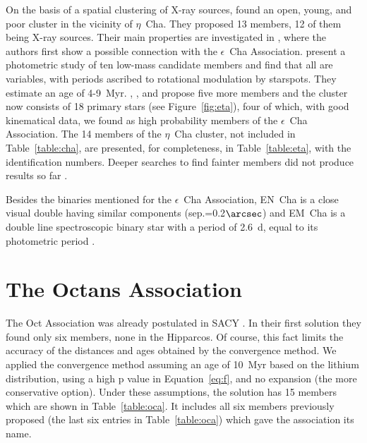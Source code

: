 \documentclass[11pt,twoside]{book}
\begin{document}
On the basis of a spatial clustering of X-ray sources, \citet{mamajek99} found
an open, young, and poor cluster in the vicinity of $\eta$~Cha.
They proposed 13 members, 12 of them being X-ray sources.
Their main properties are investigated in \citet{mamajek00}, where the
authors first show a possible connection with the $\epsilon$~Cha
Association.  \citet{lawson01} present a photometric study of ten
low-mass candidate members and find that all are variables, with
periods ascribed to rotational modulation by starspots.  They estimate
an age of 4-9~Myr.  \citet{lawson02}, \citet{song04}, and \citet{lyo04} propose
five more members and the cluster now consists of 18 primary stars
(see Figure~\ref{fig:eta}), four of which, with good kinematical data,
we found as high probability members of the $\epsilon$~Cha
Association.  The 14 members of the $\eta$~Cha cluster, not included
in Table~\ref{table:cha}, are presented, for completeness, in
Table~\ref{table:eta}, with the \citet{luhmans04} identification
numbers.  Deeper searches to find fainter members did not produce
results so far \citep{luhman04, lyo06}.

Besides the binaries mentioned for the $\epsilon$~Cha Association, EN~Cha is a
close visual double having similar components (sep.=0.2$\arcsec$)
\citep{brandeker06} and EM~Cha is a double line spectroscopic binary star with a
period of 2.6~d, equal to  its photometric period \citep{lyo03}.



\section{The Octans Association}

The Oct Association was already postulated in SACY \citep{torres03a,
torres03}.  In their first solution they found only six members, none
in the Hipparcos.  Of course, this fact limits the accuracy of the
distances and ages obtained by the convergence method.  We applied the
convergence method assuming an age of 10~Myr based on the lithium
distribution, using a high p value in Equation~\ref{eq:f}, and no
expansion (the more conservative option).  Under these assumptions,
the solution has 15 members which are shown in Table~\ref{table:oca}.
It includes all six members previously proposed (the last six entries in
Table~\ref{table:oca}) which gave the association its name.
\end{document}
